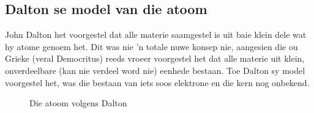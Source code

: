 \subsection*{Dalton se model van die atoom}
\begin{minipage}{.5\textwidth}
John Dalton het voorgestel dat alle materie saamgestel is uit baie klein dele wat hy atome genoem het. Dit was nie  'n totale nuwe konsep nie, aangesien die ou Grieke (veral Democritus) reeds vroeer voorgestel het dat alle materie uit klein, onverdeelbare (kan nie verdeel word nie) eenhede bestaan. Toe Dalton sy model voorgestel het, was die bestaan van iets soos elektrone en die kern nog onbekend. 
\end{minipage}
\begin{minipage}{.5\textwidth}
   \setcounter{subfigure}{0}
	\begin{figure}[H] %
    \begin{center}
\begin{minipage}{.8\textwidth}
\caption{Die atoom volgens Dalton}
\end{minipage}
\label{fig:atom:dalton}
\end{center}
 \end{figure}
\end{minipage}

      \label{m38756*uid1}

